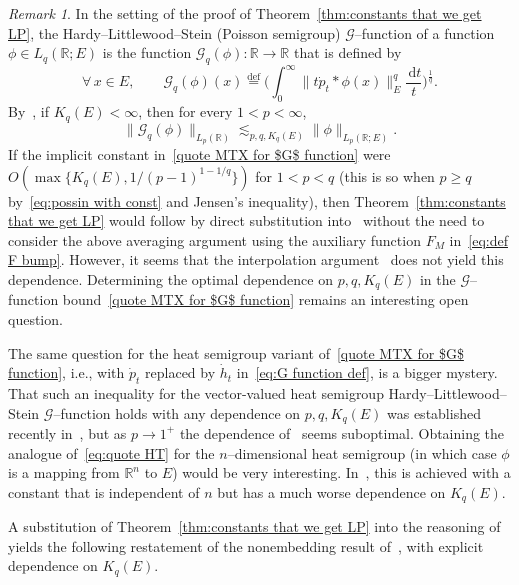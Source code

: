 \documentclass[11pt,reqno]{amsart}
\newcommand{\R}{\mathbb{R}}
\newcommand{\ud}[0]{\,\mathrm{d}}
\newcommand{\0}{\mathbf{0}}
\renewcommand{\1}{\mathbf 1}
\newcommand{\from}{\colon}
\newcommand{\eqdef}{\stackrel{\mathrm{def}}{=}}
\renewcommand{\ge}{\geqslant}
\theoremstyle{remark}
\newtheorem{remark}[thm]{Remark}
\begin{document}
\begin{remark} In the setting of the proof of Theorem~\ref{thm:constants that we get LP}, the Hardy--Littlewood--Stein (Poisson semigroup) $\mathcal{G}$--function of a function $\phi\in L_q(\R;E)$ is the function $\mathcal{G}_q(\phi)\from \R\to \R$ that  is defined by
\begin{equation}\label{eq:G function def}
\forall\, x\in E,\qquad \mathcal{G}_q(\phi)(x)\eqdef \bigg(\int_0^\infty \|t\dot{p}_t*\phi(x)\|_{E}^q\frac{\ud t}{t}\bigg)^{\frac{1}{q}}.
\end{equation}
By~\cite{MTX06}, if $K_q(E)<\infty$, then  for every $1<p<\infty$,
\begin{equation}\label{quote MTX for $G$ function}
\|\mathcal{G}_q(\phi)\|_{L_p(\R)}\lesssim_{p,q,K_q(E)} \|\phi\|_{L_p(\R;E)}.
\end{equation}
If the implicit constant  in~\eqref{quote MTX for $G$ function} were $O(\max\{K_{q}(E),1/(p-1)^{1-1/q}\})$  for $1<p<q$ (this is so when $p\ge q$ by~\eqref{eq:possin with const} and Jensen's inequality), then  Theorem~\ref{thm:constants that we get LP} would follow by direct substitution into~\cite{LafforgueNaor} without the need to consider the above averaging argument using the auxiliary function $F_M$ in~\eqref{eq:def F bump}. However, it seems that the interpolation argument~\cite{MTX06} does not yield this dependence. Determining the optimal dependence on  $p,q,K_q(E)$ in the $\mathcal{G}$--function bound~\eqref{quote MTX for $G$ function} remains an interesting open question.

The same question for the heat semigroup variant of~\eqref{quote MTX for $G$ function}, i.e., with $\dot{p}_t$ replaced by $\dot{h}_t$ in~\eqref{eq:G function def}, is  a  bigger mystery. That such an inequality for the vector-valued heat semigroup Hardy--Littlewood--Stein $\mathcal{G}$--function holds with any dependence on $p,q,K_q(E)$ was  established recently in~\cite{Xu18}, but as $p\to 1^+$  the dependence of~\cite{Xu18} seems suboptimal. Obtaining the analogue of~\eqref{eq:quote HT} for the $n$--dimensional heat semigroup (in which case $\phi$ is a mapping from $\R^n$ to $E$) would be very interesting. In~\cite{Xu18}, this is achieved with a constant that is independent of $n$ but has a much worse dependence on $K_q(E)$.
\end{remark}



A substitution of Theorem~\ref{thm:constants that we get LP} into the reasoning of~\cite{LafforgueNaor} yields the following restatement of the nonembedding result of~\cite{LafforgueNaor},  with explicit dependence on $K_q(E)$.
\end{document}
